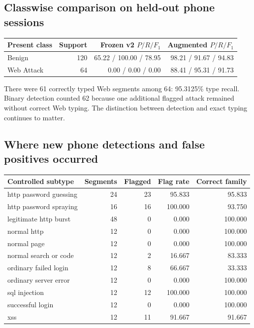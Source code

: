 \documentclass[11pt,a4paper,oneside]{report}
\begin{document}
\subsection{Classwise comparison on held-out phone sessions}

{\small
\begin{longtable}{@{}lrrr@{}}
\toprule
Present class & Support & Frozen v2 $P/R/F_1$ & Augmented $P/R/F_1$\\\midrule\endhead
Benign & 120 & 65.22 / 100.00 / 78.95 & 98.21 / 91.67 / 94.83\\
Web Attack & 64 & 0.00 / 0.00 / 0.00 & 88.41 / 95.31 / 91.73\\
\bottomrule\end{longtable}
}

There were 61 correctly typed Web segments among 64: 95.3125\% type recall. Binary detection counted 62 because one additional flagged attack remained without correct Web typing. The distinction between detection and exact typing continues to matter.

\subsection{Where new phone detections and false positives occurred}

{\small
\begin{longtable}{@{}lrrrr@{}}
\toprule
Controlled subtype & Segments & Flagged & Flag rate & Correct family\\\midrule\endhead
http password guessing & 24 & 23 & 95.833 & 95.833\\
http password spraying & 16 & 16 & 100.000 & 93.750\\
legitimate http burst & 48 & 0 & 0.000 & 100.000\\
normal http & 12 & 0 & 0.000 & 100.000\\
normal page & 12 & 0 & 0.000 & 100.000\\
normal search or code & 12 & 2 & 16.667 & 83.333\\
ordinary failed login & 12 & 8 & 66.667 & 33.333\\
ordinary server error & 12 & 0 & 0.000 & 100.000\\
sql injection & 12 & 12 & 100.000 & 100.000\\
successful login & 12 & 0 & 0.000 & 100.000\\
xss & 12 & 11 & 91.667 & 91.667\\
\bottomrule\end{longtable}
}
\end{document}
